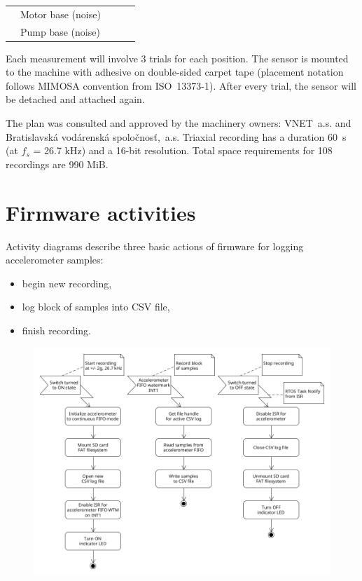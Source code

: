 \begin{table}[ht]
\begin{tabular}{|l|l|p{0.6cm}|p{0.6cm}|p{0.6cm}|p{0.6cm}|p{0.6cm}|p{0.6cm}|}
                                                                                      & Motor base (noise)                      & \multicolumn{2}{p{1.2cm}|}{}                 & \multicolumn{2}{p{1.2cm}|}{}                 & \multicolumn{2}{p{1.2cm}|}{}                 \\ \cline{2-8} 
                                                                                      & Pump base (noise)                       & \multicolumn{2}{p{1.2cm}|}{}                 & \multicolumn{2}{p{1.2cm}|}{}                 & \multicolumn{2}{p{1.2cm}|}{}                 \\ \hline
\end{tabular}
\end{table}
Each measurement will involve 3 trials for each position. The sensor is mounted to the machine with adhesive on double-sided carpet tape (placement notation follows MIMOSA convention from ISO~13373-1). After every trial, the sensor will be detached and attached again. 

The plan was consulted and approved by the machinery owners: VNET~a.s. and Bratislavská vodárenská spoločnosť,~a.s. Triaxial recording has a duration 60~s (at $f_s$ = 26.7 kHz) and a 16-bit resolution. Total space requirements for 108 recordings are 990 MiB.

\section{Firmware activities}

Activity diagrams describe three basic actions of firmware for logging accelerometer samples:

\begin{itemize}
\itemsep0pt
\item begin new recording, 
\item log block of samples into CSV file,
\item finish recording.
\end{itemize}

\begin{figure}[h]
    \centering
	\includegraphics[width=\textwidth]{assets/design/firmware-design.png}
\end{figure} 
